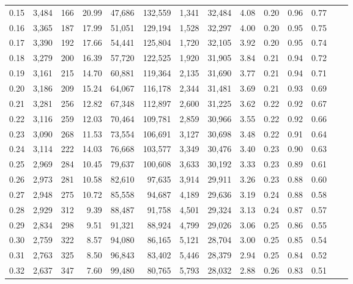 \begin{tabular}{rrrrrrrrrrrrrr}
0.15 &  3,484 &  166 &   20.99 &   47,686 &  132,559 &   1,341 &  32,484 &  4.08 &  0.20 &  0.96 &      0.77 \\
0.16 &  3,365 &  187 &   17.99 &   51,051 &  129,194 &   1,528 &  32,297 &  4.00 &  0.20 &  0.95 &      0.75 \\
0.17 &  3,390 &  192 &   17.66 &   54,441 &  125,804 &   1,720 &  32,105 &  3.92 &  0.20 &  0.95 &      0.74 \\
0.18 &  3,279 &  200 &   16.39 &   57,720 &  122,525 &   1,920 &  31,905 &  3.84 &  0.21 &  0.94 &      0.72 \\
0.19 &  3,161 &  215 &   14.70 &   60,881 &  119,364 &   2,135 &  31,690 &  3.77 &  0.21 &  0.94 &      0.71 \\
0.20 &  3,186 &  209 &   15.24 &   64,067 &  116,178 &   2,344 &  31,481 &  3.69 &  0.21 &  0.93 &      0.69 \\
0.21 &  3,281 &  256 &   12.82 &   67,348 &  112,897 &   2,600 &  31,225 &  3.62 &  0.22 &  0.92 &      0.67 \\
0.22 &  3,116 &  259 &   12.03 &   70,464 &  109,781 &   2,859 &  30,966 &  3.55 &  0.22 &  0.92 &      0.66 \\
0.23 &  3,090 &  268 &   11.53 &   73,554 &  106,691 &   3,127 &  30,698 &  3.48 &  0.22 &  0.91 &      0.64 \\
0.24 &  3,114 &  222 &   14.03 &   76,668 &  103,577 &   3,349 &  30,476 &  3.40 &  0.23 &  0.90 &      0.63 \\
0.25 &  2,969 &  284 &   10.45 &   79,637 &  100,608 &   3,633 &  30,192 &  3.33 &  0.23 &  0.89 &      0.61 \\
0.26 &  2,973 &  281 &   10.58 &   82,610 &   97,635 &   3,914 &  29,911 &  3.26 &  0.23 &  0.88 &      0.60 \\
0.27 &  2,948 &  275 &   10.72 &   85,558 &   94,687 &   4,189 &  29,636 &  3.19 &  0.24 &  0.88 &      0.58 \\
0.28 &  2,929 &  312 &    9.39 &   88,487 &   91,758 &   4,501 &  29,324 &  3.13 &  0.24 &  0.87 &      0.57 \\
0.29 &  2,834 &  298 &    9.51 &   91,321 &   88,924 &   4,799 &  29,026 &  3.06 &  0.25 &  0.86 &      0.55 \\
0.30 &  2,759 &  322 &    8.57 &   94,080 &   86,165 &   5,121 &  28,704 &  3.00 &  0.25 &  0.85 &      0.54 \\
0.31 &  2,763 &  325 &    8.50 &   96,843 &   83,402 &   5,446 &  28,379 &  2.94 &  0.25 &  0.84 &      0.52 \\
0.32 &  2,637 &  347 &    7.60 &   99,480 &   80,765 &   5,793 &  28,032 &  2.88 &  0.26 &  0.83 &      0.51 \\

\end{tabular}
